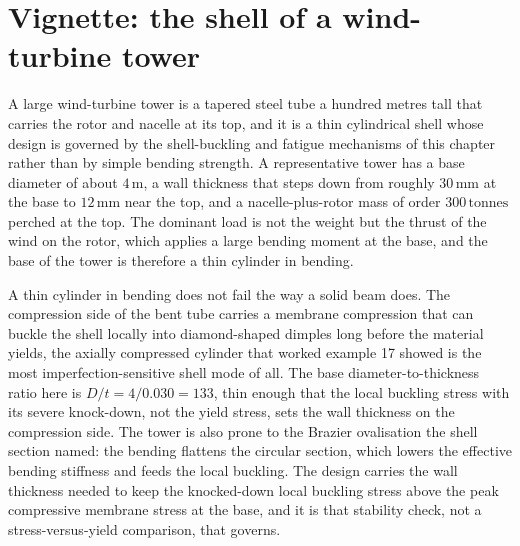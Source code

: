 \section{Vignette: the shell of a wind-turbine tower}

A large wind-turbine tower is a tapered steel tube a hundred metres tall
that carries the rotor and nacelle at its top, and it is a thin cylindrical
shell whose design is governed by the shell-buckling and fatigue mechanisms
of this chapter rather than by simple bending strength. A representative
tower has a base diameter of about $4\,\si{\meter}$, a wall thickness that
steps down from roughly $30\,\si{\milli\meter}$ at the base to $12\,\si{
\milli\meter}$ near the top, and a nacelle-plus-rotor mass of order $300\,
\text{tonnes}$ perched at the top. The dominant load is not the weight but
the thrust of the wind on the rotor, which applies a large bending moment at
the base, and the base of the tower is therefore a thin cylinder in bending.

A thin cylinder in bending does not fail the way a solid beam does. The
compression side of the bent tube carries a membrane compression that can
buckle the shell locally into diamond-shaped dimples long before the
material yields, the axially compressed cylinder that worked example 17
showed is the most imperfection-sensitive shell mode of all. The base
diameter-to-thickness ratio here is $D/t = 4/0.030 = 133$, thin enough that
the local buckling stress with its severe knock-down, not the yield stress,
sets the wall thickness on the compression side. The tower is also prone to
the Brazier ovalisation the shell section named: the bending flattens the
circular section, which lowers the effective bending stiffness and feeds the
local buckling. The design carries the wall thickness needed to keep the
knocked-down local buckling stress above the peak compressive membrane
stress at the base, and it is that stability check, not a stress-versus-yield
comparison, that governs.

